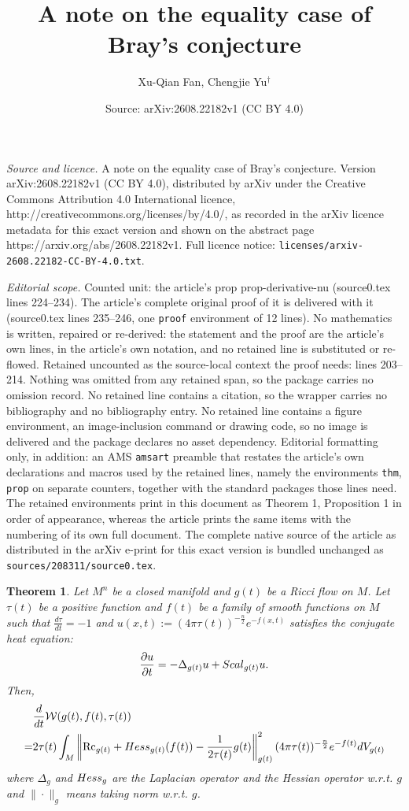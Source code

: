 \documentclass[10pt,a4paper]{amsart}
\title{A note on the equality case of Bray's conjecture}
\author{Xu-Qian Fan, Chengjie Yu$^\dagger$}
\date{Source: arXiv:2608.22182v1 (CC BY 4.0)}
\newtheorem{thm}{Theorem}
\def\Hess{{\rm Hess}}
\def\Rc{\mbox{Rc}}
\def\Scal{{\rm Scal}}
\def\p{\partial}
\begin{document}
\maketitle

\noindent\emph{Source and licence.} A note on the equality case of Bray's conjecture. Version arXiv:2608.22182v1 (CC BY 4.0), distributed by arXiv under the Creative Commons Attribution 4.0 International licence, http://creativecommons.org/licenses/by/4.0/, as recorded in the arXiv licence metadata for this exact version and shown on the abstract page https://arxiv.org/abs/2608.22182v1. Full licence notice: \texttt{licenses/arxiv-2608.22182-CC-BY-4.0.txt}.\par\smallskip

\noindent\textit{Editorial scope.} Counted unit: the article's prop prop-derivative-nu (source0.tex lines 224--234). The article's complete original proof of it is delivered with it (source0.tex lines 235--246, one \texttt{proof} environment of 12 lines). No mathematics is written, repaired or re-derived: the statement and the proof are the article's own lines, in the article's own notation, and no retained line is substituted or re-flowed.  Retained uncounted as the source-local context the proof needs: lines 203--214.  Nothing was omitted from any retained span, so the package carries no omission record.  No retained line contains a citation, so the wrapper carries no bibliography and no bibliography entry.  No retained line contains a figure environment, an image-inclusion command or drawing code, so no image is delivered and the package declares no asset dependency.  Editorial formatting only, in addition: an AMS \texttt{amsart} preamble that restates the article's own declarations and macros used by the retained lines, namely the environments \texttt{thm}, \texttt{prop} on separate counters, together with the standard packages those lines need.  The retained environments print in this document as Theorem 1, Proposition 1 in order of appearance, whereas the article prints the same items with the numbering of its own full document.  The complete native source of the article as distributed in the arXiv e-print for this exact version is bundled unchanged as \texttt{sources/208311/source0.tex}.
\begin{thm}\label{thm-derivative-W}
Let $M^n$ be a closed manifold and $g(t)$ be a Ricci flow on $M$. Let $\tau(t)$ be a positive function and $f(t)$ be a family of smooth functions on $M$ such that $\frac{d\tau}{dt}=-1$ and $u(x,t):=(4\pi\tau(t))^{-\frac{n}{2}}e^{-f(x,t)}$ satisfies the conjugate heat equation:
$$\frac{\p u}{\p t}=-\Delta_{g(t)} u+\Scal_{g(t)}u.$$
Then,
\begin{equation}\label{eq-derivative-W}
\begin{split}
&\frac{d}{dt}\mathcal W(g(t),f(t),\tau(t))\\
=&2\tau(t)\int_M\left\|\Rc_{g(t)}+\Hess_{g(t)}(f(t))-\frac{1}{2\tau(t)}g(t)\right\|_{g(t)}^2(4\pi\tau(t))^{-\frac{n}{2}}e^{-f(t)}dV_{g(t)}
\end{split}
\end{equation}
where $\Delta_g$ and $\Hess_g$ are the Laplacian operator and the Hessian operator w.r.t. $g$ and $\|\cdot\|_g$ means taking norm w.r.t. $g$.
\end{thm}
\end{document}
